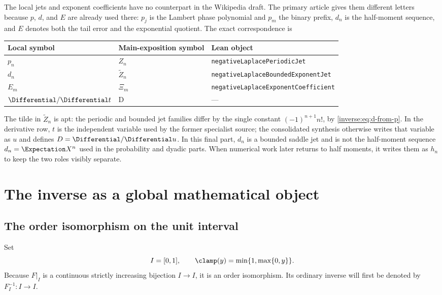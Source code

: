 \documentclass[11pt,oneside]{article}
\theoremstyle{definition}
\theoremstyle{remark}
\begin{document}
The local jets and exponent coefficients have no counterpart in the Wikipedia draft.  The
primary article gives them different letters because \(p\), \(d\), and \(E\) are already
used there: \(p_j\) is the Lambert phase polynomial and \(p_m\) the binary prefix, \(d_n\)
is the half-moment sequence, and \(E\) denotes both the tail error and the exponential
quotient.  The exact correspondence is
\begin{center}
\begin{tabular}{@{}lll@{}}
\toprule
Local symbol & Main-exposition symbol & Lean object \\
\midrule
\(p_n\) & \(Z_n\) & \nolinkurl{negativeLaplacePeriodicJet} \\
\(d_n\) & \(\widetilde Z_n\) & \nolinkurl{negativeLaplaceBoundedExponentJet} \\
\(E_m\) & \(\Xi_m\) & \nolinkurl{negativeLaplaceExponentCoefficient} \\
\(\Differential/\Differential t\) & \(\mathrm D\) & --- \\
\bottomrule
\end{tabular}
\end{center}

The tilde in \(\widetilde Z_n\) is apt: the periodic and bounded jet families differ by the
single constant \((-1)^{n+1}n!\), by \eqref{inverse:eq:d-from-p}.  In the derivative row,
\(t\) is the independent variable used by the former specialist source; the consolidated
synthesis otherwise writes that variable as \(u\) and defines \(D=\Differential/\Differential u\).  In this
final part, \(d_n\) is a bounded saddle jet and is not the half-moment sequence
\(d_n=\Expectation X^n\) used in the probability and dyadic parts.  When numerical work later returns
to half moments, it writes them as \(h_n\) to keep the two roles visibly separate.

\section{The inverse as a global mathematical object}
\label{inverse:sec:inverse}

\subsection{The order isomorphism on the unit interval}

Set
\[
 I=[0,1],\qquad
 \clamp(y)=\min\{1,\max\{0,y\}\}.
\]
Because $F|_I$ is a continuous strictly increasing bijection $I\to I$, it
is an order isomorphism.  Its ordinary inverse will first be denoted by
$F_I^{-1}:I\to I$.
\end{document}

